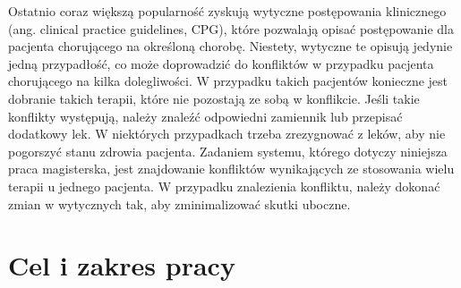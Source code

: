 \begin{spacing}{1.5}
Ostatnio coraz większą popularność zyskują wytyczne postępowania klinicznego (ang. clinical practice guidelines, CPG), które pozwalają opisać postępowanie dla pacjenta chorującego na określoną chorobę. Niestety, wytyczne te opisują jedynie jedną przypadłość, co może doprowadzić do konfliktów w przypadku pacjenta chorującego na kilka dolegliwości. W przypadku takich pacjentów konieczne jest dobranie takich terapii, które nie pozostają ze sobą w konflikcie.
Jeśli takie konflikty występują, należy znaleźć odpowiedni zamiennik lub przepisać dodatkowy lek. W niektórych przypadkach trzeba zrezygnować z leków, aby nie pogorszyć stanu zdrowia pacjenta. Zadaniem systemu, którego dotyczy niniejsza praca magisterska, jest znajdowanie konfliktów wynikających ze stosowania wielu terapii u jednego pacjenta. 
W przypadku znalezienia konfliktu, należy dokonać zmian w wytycznych tak, aby zminimalizować skutki uboczne. 


\section{Cel i zakres pracy}


\end{spacing}
